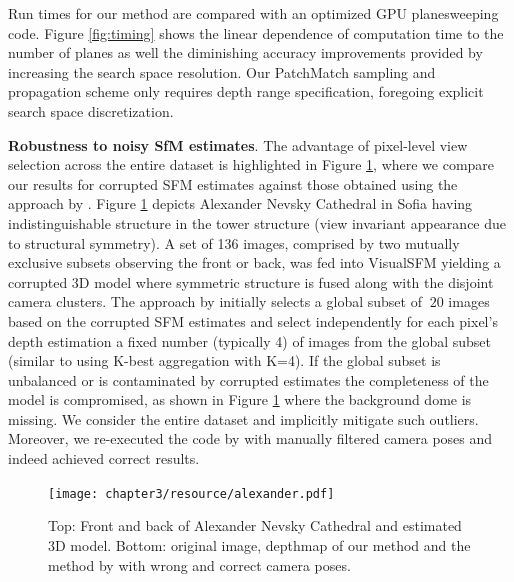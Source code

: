 Run times for our method are compared with an optimized GPU planesweeping code.
Figure \ref{fig:timing} shows the linear dependence of computation time to the number of planes as well the diminishing accuracy improvements provided by increasing the search space resolution. Our PatchMatch sampling and propagation scheme only requires depth range specification, foregoing  explicit search space discretization.



{\bf Robustness to noisy SfM estimates}. The  advantage of  pixel-level view selection across the entire dataset is highlighted  in Figure \ref{fig:alexander}, where we compare  our results for corrupted SFM estimates  against those obtained using the approach by \citet{Goesele07}.
Figure \ref{fig:alexander} depicts Alexander Nevsky Cathedral in Sofia having indistinguishable structure in the tower structure (\ie view invariant appearance due to structural symmetry). A set of 136 images, comprised by two mutually exclusive subsets observing the front or back, was fed into VisualSFM \cite{WuVSFM} yielding a corrupted 3D model where symmetric structure is fused along with the disjoint camera clusters. The approach by \citet{Goesele07} initially selects a global subset of $~20$ images based  on the corrupted SFM estimates and select  independently for each pixel's depth estimation a fixed number (typically 4) of images from the global subset (similar to using K-best aggregation with K=4). If the global subset is unbalanced or is contaminated by corrupted estimates the completeness of the model is compromised, as shown in Figure \ref{fig:alexander} where the background dome is missing. We consider the entire dataset and implicitly mitigate such outliers. Moreover, we re-executed the code by \citet{Goesele07} with manually filtered camera poses and indeed achieved correct results.

\begin{figure}
\centering
\texttt{[image: chapter3/resource/alexander.pdf]}
\caption{\label{fig:alexander} Top: Front and back of Alexander Nevsky Cathedral and estimated 3D model. Bottom: original image, depthmap of our method and the method by \citet{Goesele07} with wrong and correct camera poses.
}
\end{figure}

